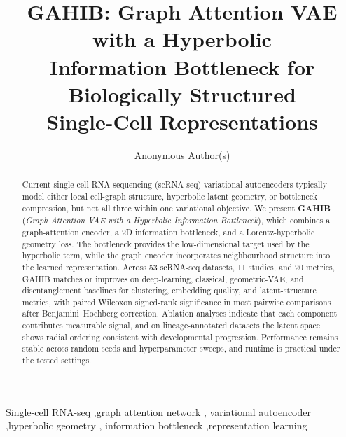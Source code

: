 \documentclass[preprint,12pt]{elsarticle}
\begin{document}
\begin{frontmatter}

\title{GAHIB: Graph Attention VAE with a Hyperbolic\\
Information Bottleneck for Biologically Structured\\
Single-Cell Representations}

\author{Anonymous Author(s)}
\address{Affiliations withheld for double-anonymous review.}

\begin{abstract}
Current single-cell RNA-sequencing (scRNA-seq) variational
autoencoders typically model either local cell-graph structure,
hyperbolic latent geometry, or bottleneck compression, but not all
three within one variational objective. We present \textbf{GAHIB}
(\emph{Graph Attention VAE with a Hyperbolic Information
Bottleneck}), which combines a graph-attention encoder, a 2D
information bottleneck, and a Lorentz-hyperbolic geometry loss.
The bottleneck provides the low-dimensional target used by the
hyperbolic term, while the graph encoder incorporates neighbourhood
structure into the learned representation. Across 53 scRNA-seq
datasets, 11 studies, and 20 metrics, GAHIB matches or improves on
deep-learning, classical, geometric-VAE, and disentanglement
baselines for clustering, embedding quality, and latent-structure
metrics, with paired Wilcoxon signed-rank significance in most
pairwise comparisons after Benjamini--Hochberg correction. Ablation
analyses indicate that each component contributes measurable signal,
and on lineage-annotated datasets the latent space shows radial
ordering consistent with developmental progression. Performance
remains stable across random seeds and hyperparameter sweeps, and
runtime is practical under the tested settings.
\end{abstract}

\begin{keyword}
Single-cell RNA-seq \sep graph attention network \sep
variational autoencoder \sep hyperbolic geometry \sep
information bottleneck \sep representation learning
\end{keyword}


\end{frontmatter}
\end{document}
